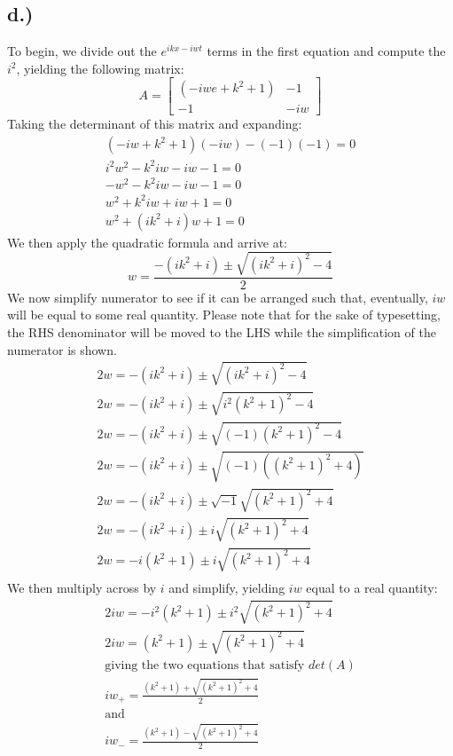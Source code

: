 \documentclass{article}
\begin{document}
\subsection*{d.)}
To begin, we divide out the $e^{ikx - iwt}$ terms in the first equation and compute the $i^2$, yielding the following matrix:
\[
A =
\begin{bmatrix}
(-iwe + k^2 + 1) & -1\\
-1 & -iw
\end{bmatrix}
\]
Taking the determinant of this matrix and expanding:
\begin{equation}
\begin{aligned}
(-iw + k^2 + 1)(-iw) - (-1)(-1) = 0\\
i^2w^2 - k^2iw - iw -1 = 0\\
-w^2 - k^2iw -iw -1 = 0\\
w^2 + k^2iw + iw + 1 = 0\\
w^2 + (ik^2 + i)w + 1 =0
\end{aligned}
\end{equation}
We then apply the quadratic formula and arrive at:
\begin{equation}
w = \frac{-(ik^2 + i) \pm \sqrt{(ik^2 + i)^2 -4}}{2}
\end{equation}
We now simplify numerator to see if it can be arranged such that, eventually, $iw$ will be equal to some real quantity. Please note that for the sake of typesetting, the RHS denominator will be moved to the LHS while the simplification of the numerator is shown.
\begin{equation}
\begin{aligned}
2w = -(ik^2 + i) \pm \sqrt{(ik^2 + i)^2 -4}\\
2w = -(ik^2 + i) \pm \sqrt{i^2(k^2 + 1)^2 -4}\\
2w = -(ik^2 + i) \pm \sqrt{(-1)(k^2 + 1)^2 -4}\\
2w = -(ik^2 + i) \pm \sqrt{(-1)((k^2 + 1)^2 +4)}\\
2w = -(ik^2 + i) \pm \sqrt{-1}\sqrt{(k^2 + 1)^2 +4}\\
2w = -(ik^2 + i) \pm i\sqrt{(k^2 + 1)^2 +4}\\
2w = -i(k^2 + 1) \pm i\sqrt{(k^2 + 1)^2 +4}\\
\end{aligned}
\end{equation}
We then multiply across by $i$ and simplify, yielding $iw$ equal to a real quantity:
\begin{equation}
\begin{aligned}
2iw = -i^2(k^2 + 1) \pm i^2\sqrt{(k^2 + 1)^2 +4}\\
2iw = (k^2 + 1) \pm \sqrt{(k^2 + 1)^2 +4}\\
\text{giving the two equations that satisfy $det(A)$}\\
iw_+ = \frac{(k^2 + 1) + \sqrt{(k^2 + 1)^2 +4}}{2}\\
\text{and}\\
iw_- = \frac{(k^2 + 1) - \sqrt{(k^2 + 1)^2 +4}}{2}\\
\end{aligned}
\end{equation}
\end{document}
